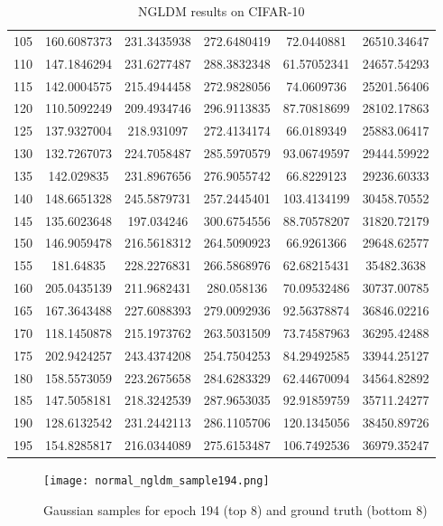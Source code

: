 \documentclass[10pt,twocolumn,letterpaper]{article}
\begin{document}
\begin{table}[h!]
\begin{tabular}{|c|c|c|c|c|c|}
105 & 160.6087373 & 231.3435938 & 272.6480419 & 72.0440881 & 26510.34647 \\
110 & 147.1846294 & 231.6277487 & 288.3832348 & 61.57052341 & 24657.54293 \\
115 & 142.0004575 & 215.4944458 & 272.9828056 & 74.0609736 & 25201.56406 \\
120 & 110.5092249 & 209.4934746 & 296.9113835 & 87.70818699 & 28102.17863 \\
125 & 137.9327004 & 218.931097 & 272.4134174 & 66.0189349 & 25883.06417 \\
130 & 132.7267073 & 224.7058487 & 285.5970579 & 93.06749597 & 29444.59922 \\
135 & 142.029835 & 231.8967656 & 276.9055742 & 66.8229123 & 29236.60333 \\
140 & 148.6651328 & 245.5879731 & 257.2445401 & 103.4134199 & 30458.70552 \\
145 & 135.6023648 & 197.034246 & 300.6754556 & 88.70578207 & 31820.72179 \\
150 & 146.9059478 & 216.5618312 & 264.5090923 & 66.9261366 & 29648.62577 \\
155 & 181.64835 & 228.2276831 & 266.5868976 & 62.68215431 & 35482.3638 \\
160 & 205.0435139 & 211.9682431 & 280.058136 & 70.09532486 & 30737.00785 \\
165 & 167.3643488 & 227.6088393 & 279.0092936 & 92.56378874 & 36846.02216 \\
170 & 118.1450878 & 215.1973762 & 263.5031509 & 73.74587963 & 36295.42488 \\
175 & 202.9424257 & 243.4374208 & 254.7504253 & 84.29492585 & 33944.25127 \\
180 & 158.5573059 & 223.2675658 & 284.6283329 & 62.44670094 & 34564.82892 \\
185 & 147.5058181 & 218.3242539 & 287.9653035 & 92.91859759 & 35711.24277 \\
190 & 128.6132542 & 231.2442113 & 286.1105706 & 120.1345056 & 38450.89726 \\
195 & 154.8285817 & 216.0344089 & 275.6153487 & 106.7492536 & 36979.35247 \\
\hline
\end{tabular}
\caption{NGLDM results on CIFAR-10}
\label{table:your_label}
\end{table}
\twocolumn

\begin{figure*}
  \centering
  \texttt{[image: normal\_ngldm\_sample194.png]}
  \caption{Gaussian samples for epoch 194 (top 8) and ground truth (bottom 8)}
  \hfill
\end{figure*}
\end{document}

